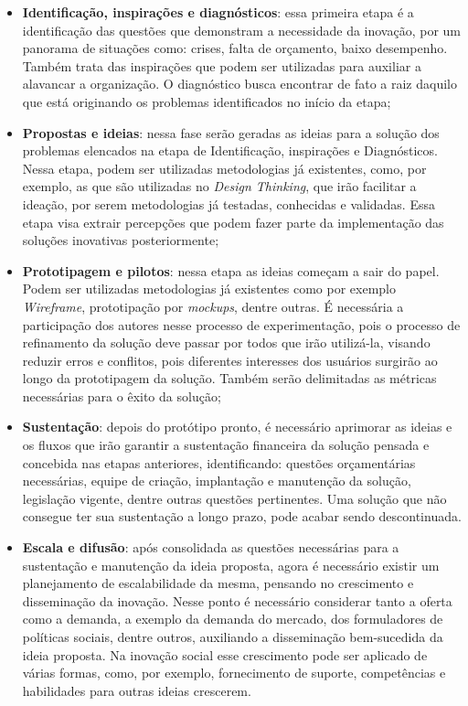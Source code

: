 \begin{itemize}
    \item \textbf{Identificação, inspirações e diagnósticos}: essa primeira etapa é a identificação das questões que demonstram a necessidade da inovação, por um panorama de situações como: crises, falta de orçamento, baixo desempenho. Também trata das inspirações que podem ser utilizadas para auxiliar a alavancar a organização. O diagnóstico busca encontrar de fato a raiz daquilo que está originando os problemas identificados no início da etapa;
    \item \textbf{Propostas e ideias}: nessa fase serão geradas as ideias para a solução dos problemas elencados na etapa de Identificação, inspirações e Diagnósticos. Nessa etapa, podem ser utilizadas metodologias já existentes, como, por exemplo, as que são utilizadas no \textit{Design Thinking}, que irão facilitar a ideação, por serem metodologias já testadas, conhecidas e validadas. Essa etapa visa extrair percepções que podem fazer parte da implementação das soluções inovativas posteriormente;
    \item \textbf{Prototipagem e pilotos}: nessa etapa as ideias começam a sair do papel. Podem ser utilizadas metodologias já existentes como por exemplo \textit{Wireframe}, prototipação por \textit{mockups}, dentre outras. É necessária a participação dos autores nesse processo de experimentação, pois o processo de refinamento da solução deve passar por todos que irão utilizá-la, visando reduzir erros e conflitos, pois diferentes interesses dos usuários surgirão ao longo da prototipagem da solução. Também serão delimitadas as métricas necessárias para o êxito da solução;
    \item \textbf{Sustentação}: depois do protótipo pronto, é necessário aprimorar as ideias e os fluxos que irão garantir a sustentação financeira da solução pensada e concebida nas etapas anteriores, identificando: questões orçamentárias necessárias, equipe de criação, implantação e manutenção da solução, legislação vigente, dentre outras questões pertinentes. Uma solução que não consegue ter sua sustentação a longo prazo, pode acabar sendo descontinuada.
    \item \textbf{Escala e difusão}: após consolidada as questões necessárias para a sustentação e manutenção da ideia proposta, agora é necessário existir um planejamento de escalabilidade da mesma, pensando no crescimento e disseminação da inovação. Nesse ponto é necessário considerar tanto a oferta como a demanda, a exemplo da demanda do mercado, dos formuladores de políticas sociais, dentre outros, auxiliando a disseminação bem-sucedida da ideia proposta. Na inovação social esse crescimento pode ser aplicado de várias formas, como, por exemplo, fornecimento de suporte, competências e habilidades para outras ideias crescerem.

\end{itemize}
